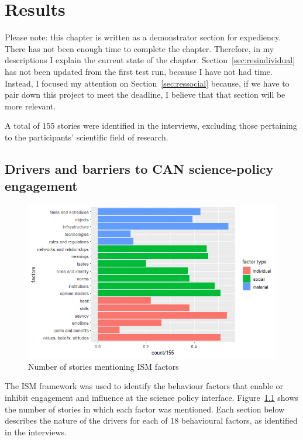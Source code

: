 \chapter{Results}\label{ch:results}

Please note: this chapter is written as a demonstrator section for expediency. There has not been enough time to complete the chapter. Therefore, in my descriptions I explain the current state of the chapter. Section~\ref{sec:resindividual} has not been updated from the first test run, because I have not had time. Instead, I focused my attention on Section~\ref{sec:ressocial} because, if we have to pair down this project to meet the deadline, I believe that that section will be more relevant.

A total of 155 stories were identified in the interviews, excluding those pertaining to the participants' scientific field of research.

\section{Drivers and barriers to CAN science-policy engagement}\label{sec:resultsISM}

\begin{figure}[!ht]
    \centering
    \includegraphics[width=1\linewidth]{figures/ism_count_per_story.png}
    \caption{Number of stories mentioning ISM factors}
    \label{fig:ismstorycount}
\end{figure}

The ISM framework was used to identify the behaviour factors that enable or inhibit engagement and influence at the science policy interface. Figure~\ref{fig:ismstorycount} shows the number of stories in which each factor was mentioned. Each section below describes the nature of the drivers for each of 18 behavioural factors, as identified in the interviews.


